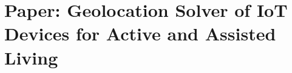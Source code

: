 \chapter{Paper: Geolocation Solver of IoT Devices for Active and Assisted Living }
\label{app:paper}


